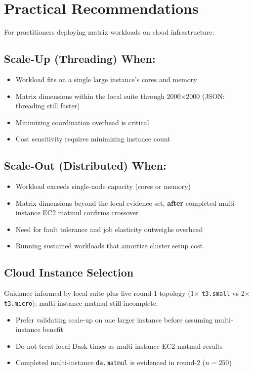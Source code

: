 \section{Practical Recommendations}

For practitioners deploying matrix workloads on cloud infrastructure:

\subsection{Scale-Up (Threading) When:}

\begin{itemize}
    \item Workload fits on a single large instance's cores and memory
    \item Matrix dimensions within the local suite through 2000×2000 (JSON: threading still faster)
    \item Minimizing coordination overhead is critical
    \item Cost sensitivity requires minimizing instance count
\end{itemize}

\subsection{Scale-Out (Distributed) When:}

\begin{itemize}
    \item Workload exceeds single-node capacity (cores or memory)
    \item Matrix dimensions beyond the local evidence set, \textbf{after} completed multi-instance EC2 matmul confirms crossover
    \item Need for fault tolerance and job elasticity outweighs overhead
    \item Running sustained workloads that amortize cluster setup cost
\end{itemize}

\subsection{Cloud Instance Selection}

Guidance informed by local suite plus live round-1 topology (1× \texttt{t3.small} vs 2× \texttt{t3.micro}); multi-instance matmul still incomplete:

\begin{itemize}
    \item Prefer validating scale-up on one larger instance before assuming multi-instance benefit
    \item Do not treat local Dask times as multi-instance EC2 matmul results
    \item Completed multi-instance \texttt{da.matmul} is evidenced in round-2 ($n{=}250$)
\end{itemize}

